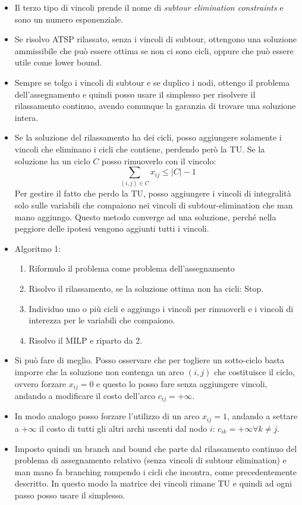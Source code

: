 \begin{itemize}
	\item Il terzo tipo di vincoli prende il nome di \textit{subtour elimination constraints} e sono un numero esponenziale.
	\item Se risolvo ATSP rilassato, senza i vincoli di subtour, ottengono una soluzione ammissibile che può essere ottima se non ci sono cicli, oppure che può essere utile come lower bound.
	\item Sempre se tolgo i vincoli di subtour e se duplico i nodi, ottengo il problema dell'assegnamento e quindi posso usare il simplesso per risolvere il rilassamento continuo, avendo comunque la garanzia di trovare una soluzione intera.
	\item Se la soluzione del rilassamento ha dei cicli, posso aggiungere solamente i vincoli che eliminano i cicli che contiene, perdendo però la TU. Se la soluzione ha un ciclo $C$ posso rimuoverlo con il vincolo:
	$$
	\sum_{(i,j) \in C} x_{ij} \leq |C| -1 
	$$
	Per gestire il fatto che perdo la TU, posso aggiungere i vincoli di integralità solo sulle variabili che compaiono nei vincoli di subtour-elimination che man mano aggiungo. Questo metodo converge ad una soluzione, perché nella peggiore delle ipotesi vengono aggiunti tutti i vincoli.
	\item Algoritmo 1:
	\begin{enumerate}
		\item Riformulo il problema come problema dell'assegnamento
		\item Risolvo il rilassamento, se la soluzione ottima non ha cicli: Stop.
		\item Individuo uno o più cicli e aggiungo i vincoli per rimuoverli e i vincoli di interezza per le variabili che compaiono.
		\item Risolvo il MILP e riparto da 2.
	\end{enumerate}
	\item Si può fare di meglio. Posso osservare che per togliere un sotto-ciclo basta imporre che la soluzione non contenga un arco $(i,j)$ che costituisce il ciclo, ovvero forzare $x_{ij} = 0$ e questo lo posso fare senza aggiungere vincoli, andando a modificare il costo dell'arco $c_{ij} = +\infty$.
	\item In modo analogo posso forzare l'utilizzo di un arco $x_{ij} = 1$, andando a settare a $+\infty$ il costo di tutti gli altri archi uscenti dal nodo $i$: $c_{ik} = +\infty \forall k \neq j$.
	\item Imposto quindi un branch and bound che parte dal rilassamento continuo del problema di assegnamento relativo (senza vincoli di subtour elimination) e man mano fa branching rompendo i cicli che incontra, come precedentemente descritto. In questo modo la matrice dei vincoli rimane TU e quindi ad ogni passo posso usare il simplesso.

\end{itemize}
